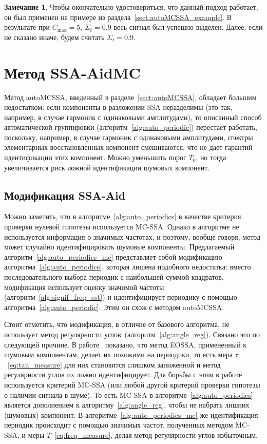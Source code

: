 \documentclass[specialist,
substylefile = spbu_report.rtx,
subf,12pt]{disser}
\theoremstyle{definition}
\newtheorem{remark}{Замечание}[chapter]
\begin{document}
\begin{remark}
	Чтобы окончательно удостовериться, что данный подход работает, он был применен на примере из раздела~\ref{sect:autoMCSSA_example}. В результате при $C_{\max}=5$, $\Sigma_t=0.9$ весь сигнал был успешно выделен. Далее, если не сказано иначе, будем считать $\Sigma_t=0.9$.
\end{remark}

\section{Метод SSA-AidMC}\label{sect:ssa_aid_mc}

Метод autoMCSSA, введенный в разделе~\ref{sect:autoMCSSA}, обладает большим недостатком: если компоненты в разложении SSA неразделимы (это так, например, в случае гармоник с одинаковыми амплитудами), то описанный способ автоматической группировки (алгоритм~\ref{alg:auto_periodic}) перестает работать, поскольку, например, в случае гармоник с одинаковыми амплитудами, спектры элементарных восстановленных компонент смешиваются, что не дает гарантий идентификации этих компонент. Можно уменьшить порог $T_0$, но тогда увеличивается риск ложной идентификации шумовых компонент.

\subsection{Модификация SSA-Aid}

Можно заметить, что в алгоритме~\ref{alg:auto_periodics} в качестве критерия проверки нулевой гипотезы используется MC-SSA. Однако в алгоритме не используется информация о значимых частотах, и поэтому, вообще говоря, метод может случайно идентифицировать шумовые компоненты. Предлагаемый алгоритм~\ref{alg:auto_periodics_mc} представляет собой модификацию алгоритма~\ref{alg:auto_periodics}, которая лишена подобного недостатка: вместо последовательного выбора периодик с наибольшей суммой квадратов, модификация использует оценку значимой частоты (алгоритм~\ref{alg:signif_freq_est}) и идентифицирует периодику с помощью алгоритма~\ref{alg:auto_periodic}. Этим он схож с методом autoMCSSA. 

Стоит отметить, что модификация, в отличие от базового алгоритма, не использует метод регулярности углов~(алгоритм~\ref{alg:angle_reg}). Связано это по следующей причине. В работе~\cite{Dudnik2025} показано, что метод EOSSA, примененный к шумовым компонентам, делает их похожими на периодики, то есть мера $\tau$~\eqref{eq:tau_measure} для них становится слишком заниженной и метод регулярности углов их ложно идентифицирует. Для борьбы с этим в работе используется критерий MC-SSA (или любой другой критерий проверки гипотезы о наличии сигнала в шуме). То есть MC-SSA в алгоритме~\ref{alg:auto_periodics} является дополнением к алгоритму~\ref{alg:angle_reg}, чтобы не набрать лишних (шумовых) компонент. В алгоритме~\ref{alg:auto_periodics_mc} же идентификация периодик происходит с помощью значимых частот, полученных методом MC-SSA, и меры $T$~\eqref{eq:freq_measure}, делая метод регулярности углов избыточным.
\end{document}
